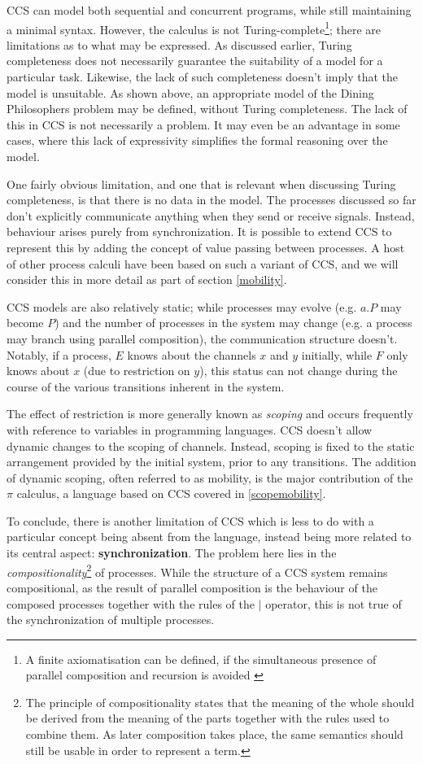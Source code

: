 CCS can model both sequential and concurrent programs, while still
maintaining a minimal syntax.  However, the calculus is not
Turing-complete\footnote{A finite axiomatisation can be defined, if
  the simultaneous presence of parallel composition and recursion is
  avoided \cite{milner:ccsaxiom}}; there are limitations as to what
may be expressed.  As discussed earlier, Turing completeness does not
necessarily guarantee the suitability of a model for a particular
task. Likewise, the lack of such completeness doesn't imply that the
model is unsuitable.  As shown above, an appropriate model of the
Dining Philosophers problem may be defined, without Turing
completeness.  The lack of this in CCS is not necessarily a problem.
It may even be an advantage in some cases, where this lack of
expressivity simplifies the formal reasoning over the model.

One fairly obvious limitation, and one that is relevant when
discussing Turing completeness, is that there is no data in the model.
The processes discussed so far don't explicitly communicate anything
when they send or receive signals.  Instead, behaviour arises purely
from synchronization.  It is possible to extend CCS to represent this
by adding the concept of value passing between processes.  A host of
other process calculi have been based on such a variant of CCS, and we
will consider this in more detail as part of section \ref{mobility}.

CCS models are also relatively static; while processes may evolve
(e.g. $a.P$ may become $P$) and the number of processes in the system
may change (e.g. a process may branch using parallel composition), the
communication structure doesn't.  Notably, if a process, $E$ knows
about the channels $x$ and $y$ initially, while $F$ only knows about
$x$ (due to restriction on $y$), this status can not change during the
course of the various transitions inherent in the system.

The effect of restriction is more generally known as \emph{scoping}
and occurs frequently with reference to variables in programming
languages.  CCS doesn't allow dynamic changes to the scoping of
channels.  Instead, scoping is fixed to the static arrangement
provided by the initial system, prior to any transitions.  The
addition of dynamic scoping, often referred to as mobility, is the
major contribution of the $\pi$ calculus, a language based on CCS
covered in \ref{scopemobility}.

To conclude, there is another limitation of CCS which is less to do
with a particular concept being absent from the language, instead
being more related to its central aspect: \textbf{synchronization}.
The problem here lies in the \emph{compositionality}\footnote{The
principle of compositionality states that the meaning of the whole
should be derived from the meaning of the parts together with the rules
used to combine them.  As later composition takes place, the same
semantics should still be usable in order to represent a term.} of
processes.  While the structure of a CCS system remains compositional,
as the result of parallel composition is the behaviour of the composed
processes together with the rules of the $|$ operator, this is not true
of the synchronization of multiple processes.

